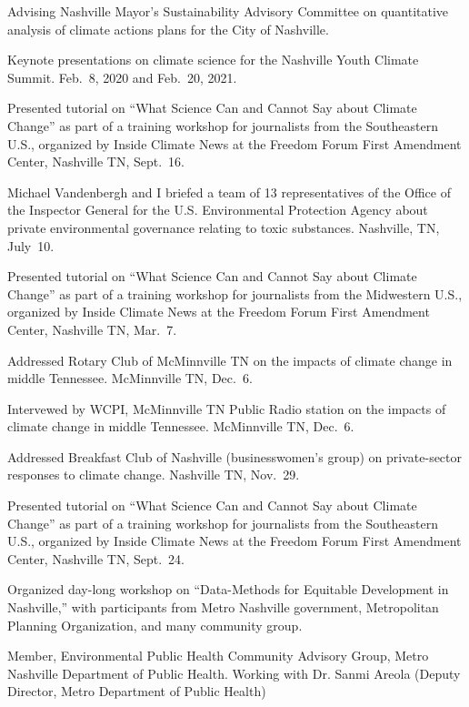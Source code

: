 \item[2020--present] Advising Nashville Mayor's Sustainability Advisory Committee on quantitative analysis of climate actions plans for the City of Nashville.
\item[2020--2021] Keynote presentations on climate science for the Nashville
  Youth Climate Summit. Feb.~8, 2020 and Feb.~20, 2021.
\item[2019] Presented tutorial on ``What Science Can and Cannot Say about Climate Change'' as part of a training workshop for journalists from the Southeastern U.S., organized by Inside Climate News at the Freedom Forum First Amendment Center, Nashville TN, Sept.~16.
\item[2019] Michael Vandenbergh and I briefed a team of 13 representatives of the Office of the Inspector General for the U.S. Environmental Protection Agency about private environmental governance relating to toxic substances. Nashville, TN, July~10.
\item[2019] Presented tutorial on ``What Science Can and Cannot Say about Climate Change'' as part of a training workshop for journalists from the Midwestern U.S., organized by Inside Climate News at the Freedom Forum First Amendment Center, Nashville TN, Mar.~7.
\item[2018] Addressed Rotary Club of McMinnville TN on the impacts of climate change in middle Tennessee. McMinnville TN, Dec.\ 6.
\item[2018] Intervewed by WCPI, McMinnville TN Public Radio station on the impacts of climate change in middle Tennessee. McMinnville TN, Dec.\ 6.
\item[2018] Addressed Breakfast Club of Nashville (businesswomen's group) on private-sector responses to climate change. Nashville TN, Nov.\ 29.
\item[2018] Presented tutorial on ``What Science Can and Cannot Say about Climate Change'' as part of a training workshop for journalists from the Southeastern U.S., organized by Inside Climate News at the Freedom Forum First Amendment Center, Nashville TN, Sept.~24.
\item[2018] Organized day-long workshop on ``Data-Methods for Equitable Development in Nashville,'' with participants from Metro Nashville government, Metropolitan Planning Organization,
            and many community group.
\item[2017--present] Member, Environmental Public Health Community Advisory Group, Metro Nashville Department of Public Health. Working with Dr. Sanmi Areola (Deputy Director, Metro Department of Public Health)
